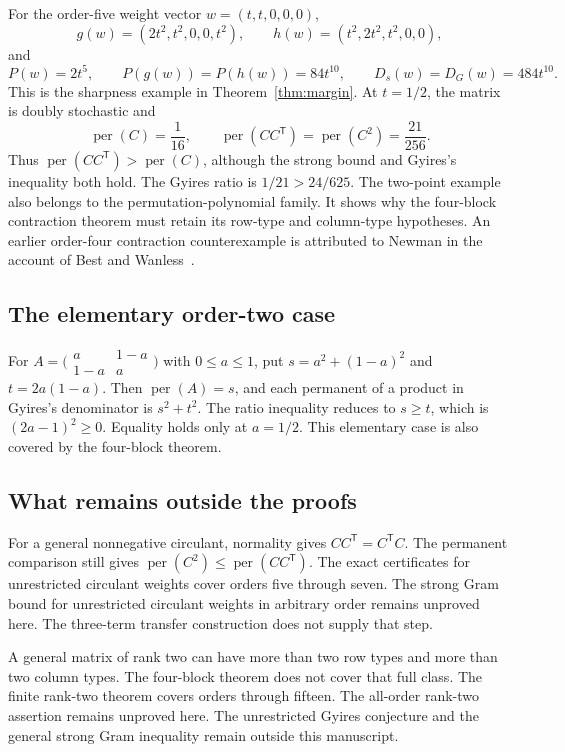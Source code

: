 \documentclass[11pt,a4paper]{article}
\theoremstyle{definition}
\theoremstyle{remark}
\newcommand{\per}{\operatorname{per}}
\newcommand{\T}{\mathsf{T}}
\begin{document}
For the order-five weight vector $w=(t,t,0,0,0)$,
\[
g(w)=(2t^2,t^2,0,0,t^2),\qquad h(w)=(t^2,2t^2,t^2,0,0),
\]
and
\[
P(w)=2t^5,\qquad P(g(w))=P(h(w))=84t^{10},\qquad D_s(w)=D_G(w)=484t^{10}.
\]
This is the sharpness example in Theorem~\ref{thm:margin}.
At $t=1/2$, the matrix is doubly stochastic and
\[
\per(C)=\frac1{16},\qquad \per(CC^\T)=\per(C^2)=\frac{21}{256}.
\]
Thus $\per(CC^\T)>\per(C)$, although the strong bound and Gyires's inequality both hold.
The Gyires ratio is $1/21>24/625$.
The two-point example also belongs to the permutation-polynomial family.
It shows why the four-block contraction theorem must retain its row-type and column-type hypotheses.
An earlier order-four contraction counterexample is attributed to Newman in the account of Best and Wanless~\cite{bw}.

\subsection{The elementary order-two case}

For
$A=\bigl(\begin{smallmatrix}a&1-a\\1-a&a\end{smallmatrix}\bigr)$ with $0\le a\le1$, put
$s=a^2+(1-a)^2$ and $t=2a(1-a)$.
Then $\per(A)=s$, and each permanent of a product in Gyires's denominator is $s^2+t^2$.
The ratio inequality reduces to $s\ge t$, which is $(2a-1)^2\ge0$.
Equality holds only at $a=1/2$.
This elementary case is also covered by the four-block theorem.

\subsection{What remains outside the proofs}

For a general nonnegative circulant, normality gives $CC^\T=C^\T C$.
The permanent comparison still gives $\per(C^2)\le\per(CC^\T)$.
The exact certificates for unrestricted circulant weights cover orders five through seven. The strong Gram bound for unrestricted circulant weights in arbitrary order remains unproved here.
The three-term transfer construction does not supply that step.

A general matrix of rank two can have more than two row types and more than two column types.
The four-block theorem does not cover that full class. The finite rank-two theorem covers orders through fifteen. The all-order rank-two assertion remains unproved here.
The unrestricted Gyires conjecture and the general strong Gram inequality remain outside this manuscript.
\end{document}
